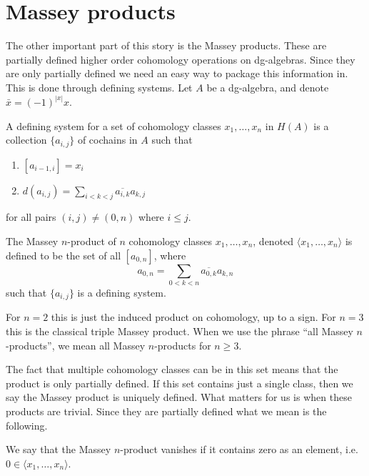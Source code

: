 

\section{Massey products}

The other important part of this story is the Massey products. These are partially defined 
higher order cohomology operations on dg-algebras. Since they are only partially defined 
we need an easy way to package this information in. This is done through defining systems. 
Let $A$ be a dg-algebra, and denote $\bar{x} = (-1)^{|x|}x$. 

\begin{definition}
    A defining system for a set of cohomology classes $x_1, \ldots, x_n$ 
    in $H(A)$ is a collection $\{ a_{i,j}\}$ of cochains in $A$ such that
    \begin{enumerate}
        \item $[a_{i-1, i}] = x_i$
        \item $d(a_{i, j}) = \sum_{i<k<j}\overline{a_{i, k}}a_{k, j}$
    \end{enumerate}
    for all pairs $(i,j)\neq (0,n)$ where $i\leq j$.
\end{definition}

\begin{definition}
    The Massey $n$-product of $n$ cohomology classes $x_1, \ldots, x_n$, 
    denoted $\langle x_1, \ldots, x_n\rangle$ is defined to be the set of all $[a_{0,n}]$, 
    where $$a_{0,n} = \sum_{0<k<n}\overline{a_{0, k}}a_{k, n}$$ such that $\{ a_{i,j} \}$ 
    is a defining system.         
\end{definition}

For $n=2$ this is just the induced product on cohomology, up to a sign. For $n=3$ this 
is the classical triple Massey product. When we use the phrase ``all Massey $n$-products'', 
we mean all Massey $n$-products for $n\geq 3$. 

The fact that multiple cohomology classes can be in this set means that the product is 
only partially defined. If this set contains just a single class, then we say the Massey 
product is uniquely defined. What matters for us is when these products are trivial. 
Since they are partially defined what we mean is the following.

\begin{definition}
    We say that the Massey $n$-product vanishes if it contains zero as an 
    element, i.e. $0\in \langle x_1, \ldots, x_n\rangle$.    
\end{definition}
